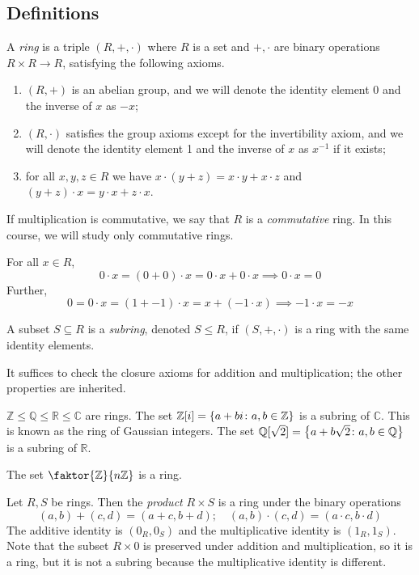 \subsection{Definitions}
\begin{definition}
	A \textit{ring} is a triple \( (R, +, \cdot) \) where \( R \) is a set and \( +, \cdot \) are binary operations \( R \times R \to R \), satisfying the following axioms.
	\begin{enumerate}
		\item \( (R, +) \) is an abelian group, and we will denote the identity element 0 and the inverse of \( x \) as \( -x \);
		\item \( (R, \cdot) \) satisfies the group axioms except for the invertibility axiom, and we will denote the identity element 1 and the inverse of \( x \) as \( x^{-1} \) if it exists;
		\item for all \( x, y, z \in R \) we have \( x \cdot (y+z) = x\cdot y + x\cdot z \) and \( (y+z)\cdot x = y \cdot x + z \cdot x \).
	\end{enumerate}
	If multiplication is commutative, we say that \( R \) is a \textit{commutative} ring.
	In this course, we will study only commutative rings.
\end{definition}
\begin{remark}
	For all \( x \in R \),
	\[
		0 \cdot x = (0+0) \cdot x = 0 \cdot x + 0 \cdot x \implies 0 \cdot x = 0
	\]
	Further,
	\[
		0 = 0 \cdot x = (1 + -1) \cdot x = x + (-1 \cdot x) \implies -1 \cdot x = -x
	\]
\end{remark}
\begin{definition}
	A subset \( S \subseteq R \) is a \textit{subring}, denoted \( S \leq R \), if \( (S, +, \cdot) \) is a ring with the same identity elements.
\end{definition}
\begin{remark}
	It suffices to check the closure axioms for addition and multiplication; the other properties are inherited.
\end{remark}
\begin{example}
	\( \mathbb Z \leq \mathbb Q \leq \mathbb R \leq \mathbb C \) are rings.
	The set \( \mathbb Z[i] = \qty{a+bi \colon a,b\in\mathbb Z} \) is a subring of \( \mathbb C \).
	This is known as the ring of Gaussian integers.
	The set \( \mathbb Q[\sqrt{2}] = \qty{a+b\sqrt{2} \colon a,b \in\mathbb Q} \) is a subring of \( \mathbb R \).
\end{example}
\begin{example}
	The set \( \faktor{\mathbb Z}{n\mathbb Z} \) is a ring.
\end{example}
\begin{example}
	Let \( R, S \) be rings.
	Then the \textit{product} \( R \times S \) is a ring under the binary operations
	\[
		(a,b) + (c,d) = (a+c,b+d);\quad (a,b) \cdot (c,d) = (a\cdot c,b\cdot d)
	\]
	The additive identity is \( (0_R, 0_S) \) and the multiplicative identity is \( (1_R, 1_S) \).
	Note that the subset \( R \times \qty{0} \) is preserved under addition and multiplication, so it is a ring, but it is not a subring because the multiplicative identity is different.
\end{example}

